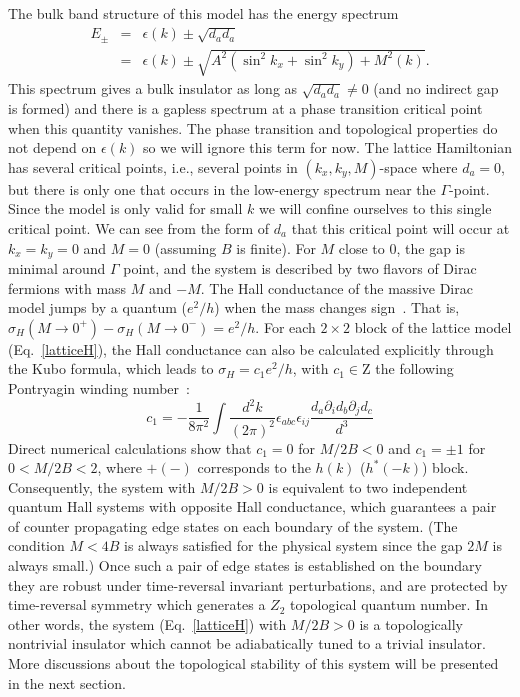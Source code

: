 \documentclass{article}
\begin{document}
The bulk band structure of this model has the energy spectrum
\begin{eqnarray}
E_{\pm}&=&\epsilon (k)\pm\sqrt{d_a d_a}\\
&=&\epsilon (k)\pm \sqrt{A^2(\sin^2 k_x +  \sin^2 k_y)+M^2 (k)}.
\end{eqnarray} This spectrum gives a bulk insulator as long as
$\sqrt{d_a d_a}\neq 0$ (and no indirect gap is formed) and there is
a gapless spectrum at a phase transition critical point when this
quantity vanishes. The phase transition  and  topological properties
do not depend on $\epsilon (k)$ so we will ignore this term for now.
The lattice Hamiltonian has several critical points, i.e., several
points in $(k_x,k_y,M)$-space where $d_a=0$, but there is only one
that occurs in the low-energy spectrum near the $\Gamma$-point.
Since the model is only valid for small $k$ we will confine
ourselves to this single critical point. We can see from the form of
$d_a$ that this critical point will occur at $k_x = k_y=0$ and $M=0$
(assuming $B$ is finite). For $M$ close to $0$, the gap is minimal
around $\Gamma$ point, and the system is described by two flavors of
Dirac fermions with mass $M$ and $-M$. The Hall conductance of the
massive Dirac model jumps by a quantum ($e^2/h$) when the mass
changes sign~\cite{redlich1984}. That is, $\sigma_H(M\rightarrow
0^+)-\sigma_H(M\rightarrow 0^-)=e^2/h$. For each $2\times 2$ block
of the lattice model (Eq.~\ref{latticeH}), the Hall conductance can
also be calculated explicitly through the Kubo formula, which leads
to $\sigma_H=c_1e^2/h$, with $c_1\in\mathrm{Z}$ the following
Pontryagin winding number~\cite{volovik2003,qi2005}:
\begin{equation}
c_1=-\frac{1}{8\pi^2} \int \frac{d^2
k}{(2\pi)^2}\epsilon_{abc}\epsilon_{ij}\frac{d_a\partial_i
d_b\partial_j d_c}{d^3}
\end{equation}
Direct numerical calculations show that $c_1=0$ for $M/2B<0$ and
$c_1=\pm 1$ for $0<M/2B<2$, where $+(-)$ corresponds to the $h(k)$
($h^*(-k)$) block. Consequently, the system with $M/2B>0$ is
equivalent to two independent quantum Hall systems with opposite
Hall conductance, which guarantees a pair of counter propagating
edge states on each boundary of the system. (The condition $M<4B$
is always satisfied for the physical system since the gap $2M$ is
always small.) Once such a pair of edge states is established on
the boundary they are robust under time-reversal invariant
perturbations, and are protected by time-reversal symmetry which
generates a $Z_2$ topological quantum number. In other words, the
system (Eq.~\ref{latticeH}) with $M/2B>0$ is a topologically
nontrivial insulator which cannot be adiabatically tuned to a
trivial insulator. More discussions about the topological
stability of this system will be presented in the next section.
\end{document}
